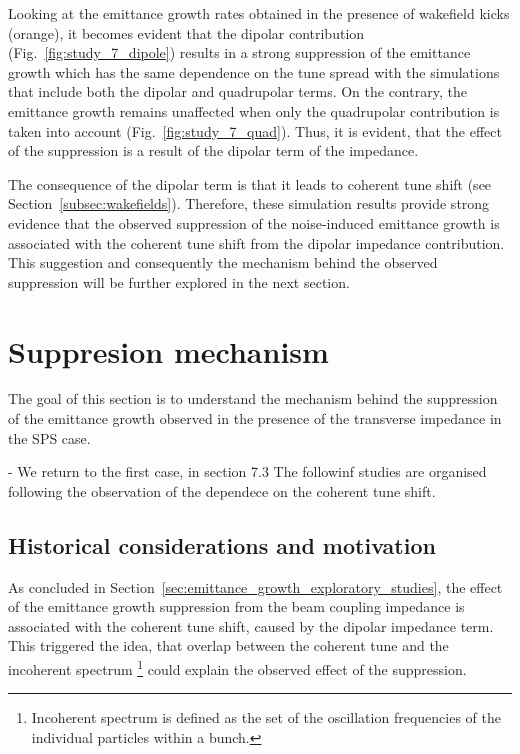 Looking at the emittance growth rates obtained in the presence of wakefield kicks (orange), it becomes evident that the dipolar contribution (Fig.~\ref{fig:study_7_dipole}) results in a strong suppression of the emittance growth which has the same dependence on the tune spread with the simulations that include both the dipolar and quadrupolar terms. On the contrary, the emittance growth remains unaffected when only the quadrupolar contribution is taken into account (Fig.~\ref{fig:study_7_quad}). Thus, it is evident, that the effect of the suppression is a result of the dipolar term of the impedance. 

The consequence of the dipolar term is that it leads to coherent tune shift (see Section~\ref{subsec:wakefields}). Therefore, these simulation results provide strong evidence that the observed suppression of the noise-induced emittance growth is associated with the coherent tune shift from the dipolar impedance contribution. This suggestion and consequently the mechanism behind the observed suppression will be further explored in the next section.


\section{Suppresion mechanism}\label{sec:suppression_mechanism}
The goal of this section is to understand the mechanism behind the suppression of the emittance growth observed in the presence of the transverse impedance in the SPS case. 

- We return to the first case, in section 7.3
The followinf studies are organised following the observation of the dependece on the coherent tune shift.

\subsection{Historical considerations and motivation}\label{subsec:past_studies_impedance_suppression_BB}

As concluded in Section~\ref{sec:emittance_growth_exploratory_studies}, the effect of the emittance growth suppression from the beam coupling impedance is associated with the coherent tune shift, caused by the dipolar impedance term. This triggered the idea, that overlap between the coherent tune and the incoherent spectrum \footnote{Incoherent spectrum is defined as the set of the oscillation frequencies of the individual particles within a bunch.} could explain the observed effect of the suppression. 

